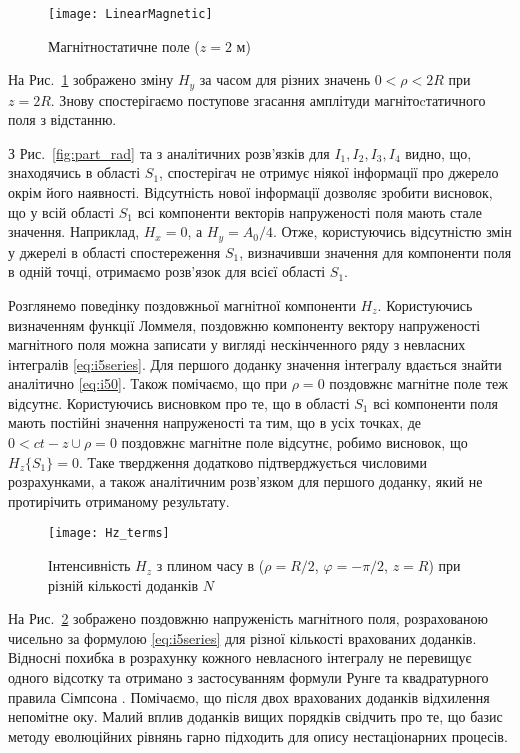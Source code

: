 \begin{figure}[h] \begin{center}
\texttt{[image: LinearMagnetic]}
\caption{Магнітностатичне поле ($ z = 2 $ м)} \label{fig:emp_h_rho}
\end{center} \end{figure}

На Рис.~\ref{fig:emp_h_rho} зображено зміну $ H_y $ за часом для 
різних значень $ 0 < \rho < 2R $ при $ z = 2R $. Знову спостерігаємо 
поступове згасання амплітуди магнітоcтатичного поля з відстанню.

З Рис.~\ref{fig:part_rad} та з аналітичних розв'язків для 
$ I_1, I_2, I_3, I_4 $ видно, що, знаходячись в області $ S_1 $, 
спостерігач не отримує ніякої інформації про джерело окрім його наявності.
Відсутність нової інформації дозволяє зробити висновок, що у всій області 
$ S_1 $ всі компоненти векторів напруженості поля мають стале значення.
Наприклад, $ H_x = 0 $, а $ H_y = A_0/4 $. Отже, користуючись відсутністю 
змін у джерелі в області спостереження $ S_1 $, визначивши значення для 
компоненти поля в одній точці, отримаємо розв'язок для всієї області $ S_1 $.  

Розглянемо поведінку поздовжньої магнітної компоненти $ H_z $. Користуючись
визначенням функції Ломмеля, поздовжню компоненту вектору напруженості 
магнітного поля можна записати у вигляді нескінченного ряду з невласних 
інтегралів \eqref{eq:i5series}. Для першого доданку значення інтегралу 
вдається знайти аналітично \eqref{eq:i50}. Також помічаємо, що при 
$ \rho = 0 $ поздовжнє магнітне поле теж відсутнє. Користуючись висновком 
про те, що в області $ S_1 $ всі компоненти поля мають постійні значення 
напруженості та тим, що в усіх точках, де $ 0 < ct - z \cup \rho = 0 $ 
поздовжнє магнітне поле відсутнє, робимо висновок, що $ H_z \{ S_1 \} = 0 $.
Таке твердження додатково підтверджується числовими розрахунками, а також
аналітичним розв'язком для першого доданку, який не протирічить отриманому
результату.

\begin{figure}[h] \begin{center}
\texttt{[image: Hz\_terms]}
\caption{Інтенсивність $H_z$ з плином часу в 
($\rho = R/2$, $\varphi = -\pi/2$, $z = R$) при 
різній кількості доданків $ N $} \label{fig:hz_terms}
\end{center} \end{figure}

На Рис.~\ref{fig:hz_terms} зображено поздовжню напруженість магнітного поля,
розрахованою чисельно за формулою \eqref{eq:i5series} для різної кількості 
врахованих доданків. Відносні похибка в розрахунку кожного невласного 
інтегралу не перевищує одного відсотку та отримано з застосуванням формули
Рунге \cite{imp:NumRecipes2007} та квадратурного правила Сімпсона 
\cite{imp:NumRecipes2007}. Помічаємо, що після двох врахованих 
доданків відхилення непомітне оку. Малий вплив доданків вищих порядків 
свідчить про те, що базис методу еволюційних рівнянь гарно підходить для 
опису нестаціонарних процесів.

